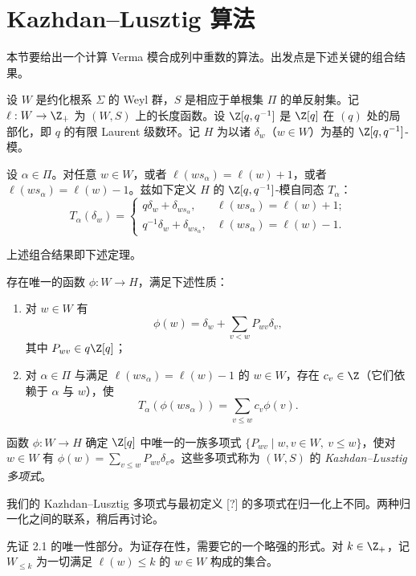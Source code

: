 \section{Kazhdan--Lusztig 算法}
\label{sec:05.5.2}

本节要给出一个计算 Verma 模合成列中重数的算法。出发点是下述关键的组合结果。

设 $W$ 是约化根系 $\Sigma$ 的 Weyl 群，$S$ 是相应于单根集 $\Pi$ 的单反射集。记 $\ell:W\to\Z_+$ 为 $(W,S)$ 上的长度函数。设 $\Z[q,q^{-1}]$ 是 $\Z[q]$ 在 $(q)$ 处的局部化，即 $q$ 的有限 Laurent 级数环。记 $H$ 为以诸 $\delta_w$（$w\in W$）为基的 $\Z[q,q^{-1}]$-模。

设 $\alpha\in\Pi$。对任意 $w\in W$，或者 $\ell(ws_\alpha)=\ell(w)+1$，或者 $\ell(ws_\alpha)=\ell(w)-1$。兹如下定义 $H$ 的 $\Z[q,q^{-1}]$-模自同态 $T_\alpha$：
$$T_\alpha(\delta_w)=
\begin{cases}
q\delta_w+\delta_{ws_\alpha}, & \ell(ws_\alpha)=\ell(w)+1;\\[2pt]
q^{-1}\delta_w+\delta_{ws_\alpha}, & \ell(ws_\alpha)=\ell(w)-1.
\end{cases}$$

上述组合结果即下述定理。

\begin{theorem}\label{thm:05.2.1}
存在唯一的函数 $\phi:W\to H$，满足下述性质：
\begin{enumerate}[label=(\roman*)]
\item 对 $w\in W$ 有
$$\phi(w)=\delta_w+\sum_{v<w}P_{wv}\delta_v,$$
其中 $P_{wv}\in q\Z[q]$；
\item 对 $\alpha\in\Pi$ 与满足 $\ell(ws_\alpha)=\ell(w)-1$ 的 $w\in W$，存在 $c_v\in\Z$（它们依赖于 $\alpha$ 与 $w$），使
$$T_\alpha(\phi(ws_\alpha))=\sum_{v\leq w}c_v\phi(v).$$
\end{enumerate}
\end{theorem}

函数 $\phi:W\to H$ 确定 $\Z[q]$ 中唯一的一族多项式 $\{P_{wv}\mid w,v\in W,\ v\leq w\}$，使对 $w\in W$ 有 $\phi(w)=\sum_{v\leq w}P_{wv}\delta_v$。这些多项式称为 $(W,S)$ 的 \emph{Kazhdan--Lusztig 多项式}。

\begin{remark}\label{rem:05.2.2}
我们的 Kazhdan--Lusztig 多项式与最初定义 [?] 的多项式在归一化上不同。两种归一化之间的联系，稍后再讨论。
\end{remark}

先证 2.1 的唯一性部分。为证存在性，需要它的一个略强的形式。对 $k\in\Z_+$，记 $W_{\leq k}$ 为一切满足 $\ell(w)\leq k$ 的 $w\in W$ 构成的集合。

